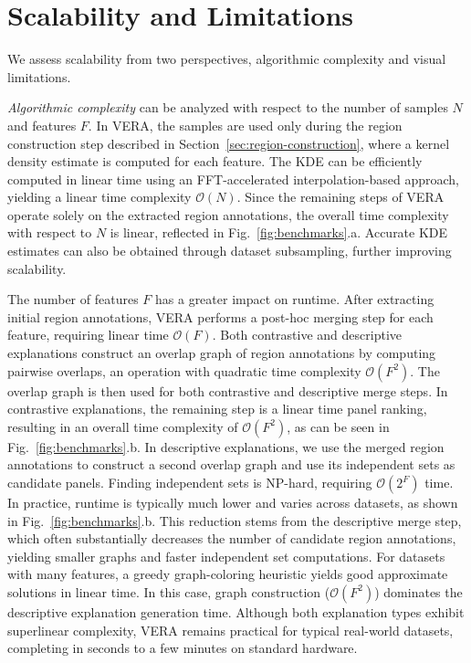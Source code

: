\documentclass[lettersize,journal]{IEEEtran}
\begin{document}
\section{Scalability and Limitations}

We assess scalability from two perspectives, algorithmic complexity and visual limitations.

\textit{Algorithmic complexity} can be analyzed with respect to the number of samples $N$ and features $F$.
In VERA, the samples are used only during the region construction step described in Section~\ref{sec:region-construction}, where a kernel density estimate is computed for each feature. The KDE can be efficiently computed in linear time using an FFT-accelerated interpolation-based approach, yielding a linear time complexity $\mathcal{O}(N)$.
Since the remaining steps of VERA operate solely on the extracted region annotations, the overall time complexity with respect to $N$ is linear, reflected in Fig.~\ref{fig:benchmarks}.a. Accurate KDE estimates can also be obtained through dataset subsampling, further improving scalability.

The number of features $F$ has a greater impact on runtime.
After extracting initial region annotations, VERA performs a post-hoc merging step for each feature, requiring linear time $\mathcal{O}(F)$.
Both contrastive and descriptive explanations construct an overlap graph of region annotations by computing pairwise overlaps, an operation with quadratic time complexity $\mathcal{O}(F^2)$. The overlap graph is then used for both contrastive and descriptive merge steps.
In contrastive explanations, the remaining step is a linear time panel ranking, resulting in an overall time complexity of $\mathcal{O}(F^2)$, as can be seen in Fig.~\ref{fig:benchmarks}.b.
In descriptive explanations, we use the merged region annotations to construct a second overlap graph and use its independent sets as candidate panels. Finding independent sets is NP-hard, requiring $\mathcal{O}(2^F)$ time.
In practice, runtime is typically much lower and varies across datasets, as shown in Fig.~\ref{fig:benchmarks}.b.
This reduction stems from the descriptive merge step, which often substantially decreases the number of candidate region annotations, yielding smaller graphs and faster independent set computations.
For datasets with many features, a greedy graph-coloring heuristic yields good approximate solutions in linear time. In this case, graph construction ($\mathcal{O}(F^2)$) dominates the descriptive explanation generation time.
Although both explanation types exhibit superlinear complexity, VERA remains practical for typical real-world datasets, completing in seconds to a few minutes on standard hardware.
\end{document}
